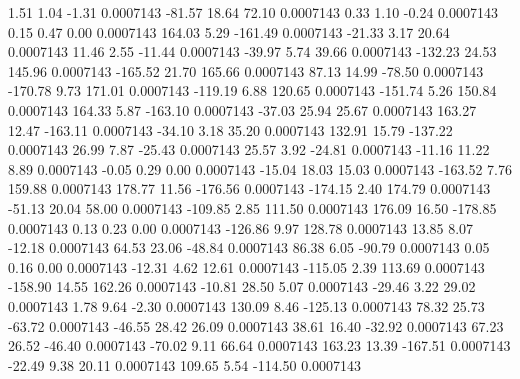         1.51        1.04       -1.31     0.0007143
      -81.57       18.64       72.10     0.0007143
        0.33        1.10       -0.24     0.0007143
        0.15        0.47        0.00     0.0007143
      164.03        5.29     -161.49     0.0007143
      -21.33        3.17       20.64     0.0007143
       11.46        2.55      -11.44     0.0007143
      -39.97        5.74       39.66     0.0007143
     -132.23       24.53      145.96     0.0007143
     -165.52       21.70      165.66     0.0007143
       87.13       14.99      -78.50     0.0007143
     -170.78        9.73      171.01     0.0007143
     -119.19        6.88      120.65     0.0007143
     -151.74        5.26      150.84     0.0007143
      164.33        5.87     -163.10     0.0007143
      -37.03       25.94       25.67     0.0007143
      163.27       12.47     -163.11     0.0007143
      -34.10        3.18       35.20     0.0007143
      132.91       15.79     -137.22     0.0007143
       26.99        7.87      -25.43     0.0007143
       25.57        3.92      -24.81     0.0007143
      -11.16       11.22        8.89     0.0007143
       -0.05        0.29        0.00     0.0007143
      -15.04       18.03       15.03     0.0007143
     -163.52        7.76      159.88     0.0007143
      178.77       11.56     -176.56     0.0007143
     -174.15        2.40      174.79     0.0007143
      -51.13       20.04       58.00     0.0007143
     -109.85        2.85      111.50     0.0007143
      176.09       16.50     -178.85     0.0007143
        0.13        0.23        0.00     0.0007143
     -126.86        9.97      128.78     0.0007143
       13.85        8.07      -12.18     0.0007143
       64.53       23.06      -48.84     0.0007143
       86.38        6.05      -90.79     0.0007143
        0.05        0.16        0.00     0.0007143
      -12.31        4.62       12.61     0.0007143
     -115.05        2.39      113.69     0.0007143
     -158.90       14.55      162.26     0.0007143
      -10.81       28.50        5.07     0.0007143
      -29.46        3.22       29.02     0.0007143
        1.78        9.64       -2.30     0.0007143
      130.09        8.46     -125.13     0.0007143
       78.32       25.73      -63.72     0.0007143
      -46.55       28.42       26.09     0.0007143
       38.61       16.40      -32.92     0.0007143
       67.23       26.52      -46.40     0.0007143
      -70.02        9.11       66.64     0.0007143
      163.23       13.39     -167.51     0.0007143
      -22.49        9.38       20.11     0.0007143
      109.65        5.54     -114.50     0.0007143

